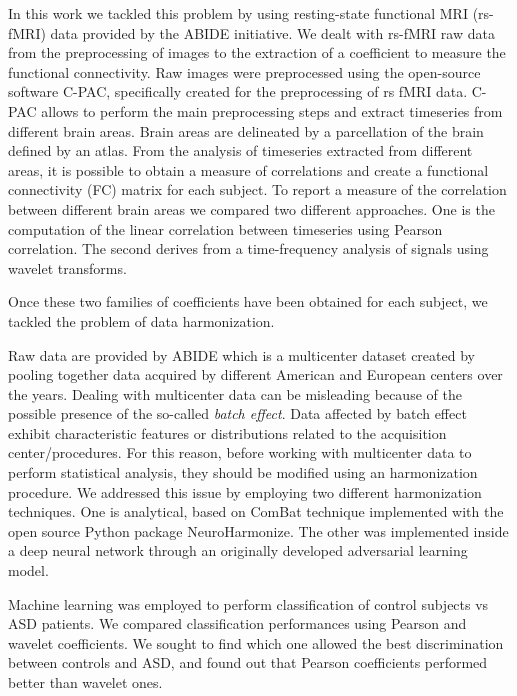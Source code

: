 \documentclass[11pt]{report}
\begin{document}
In this work we tackled this problem by using resting-state functional MRI (rs-fMRI) data provided by the ABIDE initiative.
We dealt with rs-fMRI raw data from the preprocessing of images to the extraction of a coefficient to measure the functional connectivity.
Raw images were preprocessed using the open-source software C-PAC, specifically created for the preprocessing of rs fMRI data.
C-PAC allows to perform the main preprocessing steps and extract timeseries from different brain areas.
Brain areas are delineated by a parcellation of the brain defined by an atlas.
From the analysis of timeseries extracted from different areas, it is possible to obtain a measure of correlations and create a functional connectivity (FC) matrix for each subject.
To report a measure of the correlation between different brain areas we compared two different approaches.
One is the computation of the linear correlation between timeseries using Pearson correlation. 
The second derives from a time-frequency analysis of signals using wavelet transforms.

Once these two families of coefficients have been obtained for each subject, we tackled the problem of data harmonization.

Raw data are provided by ABIDE which is a multicenter dataset created by pooling together data acquired by different American and European centers over the years.
Dealing with multicenter data can be misleading because of the possible presence of the so-called \emph{batch effect}. 
Data affected by batch effect exhibit characteristic features or distributions related to the acquisition center/procedures.
For this reason, before working with multicenter data to perform statistical analysis, they should be modified using an harmonization procedure.
We addressed this issue by employing two different harmonization techniques.
One is analytical, based on ComBat technique implemented with the open source Python package NeuroHarmonize.  
The other was implemented inside a deep neural network through an originally developed adversarial learning model.

Machine learning was employed to perform classification of control subjects vs ASD patients. 
We compared classification performances using Pearson and wavelet coefficients. 
We sought to find which one allowed the best discrimination between controls and ASD, and found out that Pearson coefficients performed better than wavelet ones.
\end{document}
